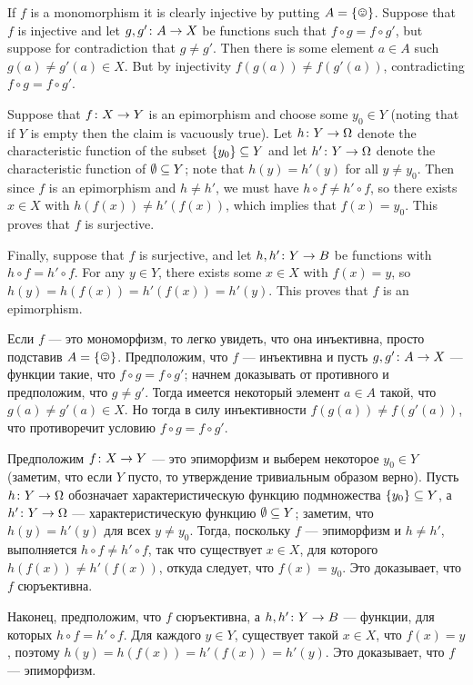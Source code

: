 \documentclass[CT4S-EN-RU]{subfiles}
\begin{document}
\begin{proofENG}
If $f$ is a monomorphism it is clearly injective by putting $A=\singleton$. Suppose that $f$ is injective and let $g,g'\taking A\to X$ be functions such that $f\circ g=f\circ g'$, but suppose for contradiction that $g\neq g'$. Then there is some element $a\in A$ such $g(a)\neq g'(a)\in X$. But by injectivity $f(g(a))\neq f(g'(a))$, contradicting $f\circ g=f\circ g'$.

Suppose that $f\taking X\to Y$ is an epimorphism and choose some $y_0\in Y$ (noting that if $Y$ is empty then the claim is vacuously true). Let $h\taking Y\to\Omega$ denote the characteristic function of the subset $\{y_0\}\ss Y$ and let $h'\taking Y\to\Omega$ denote the characteristic function of $\emptyset\ss Y$; note that $h(y)=h'(y)$ for all $y\neq y_0$. Then since $f$ is an epimorphism and $h\neq h'$, we must have $h\circ f\neq h'\circ f$, so there exists $x\in X$ with $h(f(x))\neq h'(f(x))$, which implies that $f(x)=y_0$. This proves that $f$ is surjective.

Finally, suppose that $f$ is surjective, and let $h,h'\taking Y\to B$ be functions with $h\circ f=h'\circ f$. For any $y\in Y$, there exists some $x\in X$ with $f(x)=y$, so $h(y)=h(f(x))=h'(f(x))=h'(y)$. This proves that $f$ is an epimorphism.
\end{proofENG}

\begin{proofRUS}
Если $f$ — это мономорфизм, то легко увидеть, что она инъективна, просто подставив $A=\singleton$. Предположим, что $f$ — инъективна и пусть $g,g'\taking A\to X$ — функции такие, что $f\circ g=f\circ g'$; начнем доказывать от противного и предположим, что $g\neq g'$. Тогда имеется некоторый элемент $a\in A$ такой, что $g(a)\neq g'(a)\in X$. Но тогда в силу инъективности $f(g(a))\neq f(g'(a))$, что противоречит условию $f\circ g=f\circ g'$.

Предположим $f\taking X\to Y$ — это эпиморфизм и выберем некоторое $y_0\in Y$ (заметим, что если $Y$ пусто, то утверждение тривиальным образом верно). Пусть $h\taking Y\to\Omega$ обозначает характеристическую функцию подмножества $\{y_0\}\ss Y$, а $h'\taking Y\to\Omega$ — характеристическую функцию $\emptyset\ss Y$; заметим, что $h(y)=h'(y)$ для всех $y\neq y_0$. Тогда, поскольку $f$ — эпиморфизм и $h\neq h'$, выполняется $h\circ f\neq h'\circ f$, так что существует $x\in X$, для которого $h(f(x))\neq h'(f(x))$, откуда следует, что $f(x)=y_0$. Это доказывает, что $f$ сюръективна.

Наконец, предположим, что $f$ сюръективна, а $h,h'\taking Y\to B$ — функции, для которых $h\circ f=h'\circ f$. Для каждого $y\in Y$, существует такой $x\in X$, что $f(x)=y$, поэтому $h(y)=h(f(x))=h'(f(x))=h'(y)$. Это доказывает, что $f$ — эпиморфизм.
\end{proofRUS}
\end{document}
